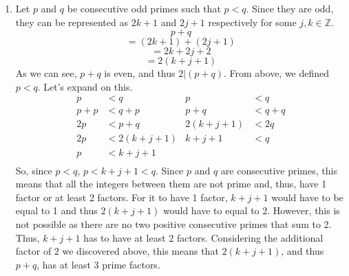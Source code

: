 \documentclass{article}
\begin{document}
\begin{enumerate}[label=\textbf{\arabic*}.]
    \item Let $p$ and $q$  be consecutive odd primes such that $p<q$. Since they are odd, they can be represented as $2k+1$ and $2j+1$ respectively for some $j,k\in\mathbb{Z}$.
    \[p+q\]
    \[=(2k+1)+(2j+1)\]
    \[=2k+2j+2\]
    \[=2(k+j+1)\]
    As we can see, $p+q$ is even, and thus $2|(p+q)$. From above, we defined $p<q$. Let's expand on this.
    \begin{align*}
        p&<q & p&<q\\
        p+p&<q+p & p+q&<q+q\\
        2p&<p+q & 2(k+j+1)&<2q\\
        2p&<2(k+j+1) & k+j+1&<q\\
        p&<k+j+1 \\
    \end{align*}
    So, since $p<q$, $p<k+j+1<q$. Since $p$ and $q$ are consecutive primes, this means that all the integers between them are not prime and, thus, have 1 factor or at least 2 factors. For it to have 1 factor, $k+j+1$ would have to be equal to 1 and thus $2(k+j+1)$ would have to equal to 2. However, this is not possible as there are no two positive consecutive primes that sum to 2. Thus, $k+j+1$ has to have at least 2 factors. Considering the additional factor of $2$ we discovered above, this means that $2(k+j+1)$, and thus $p+q$, has at least 3 prime factors.
\end{enumerate}
\end{document}
